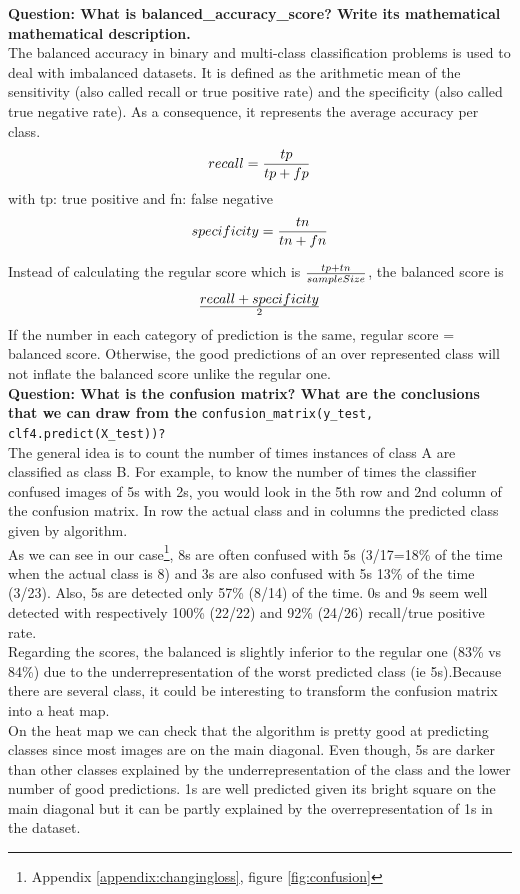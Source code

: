 \textbf{Question: What is balanced\_accuracy\_score? Write its mathematical mathematical description.} \\

The balanced accuracy in binary and multi-class classification problems is used to deal with imbalanced datasets. 
It is defined as the arithmetic mean of the sensitivity (also called recall or true positive rate) and the specificity (also called true negative rate). As a consequence, it represents the average accuracy per class.
\begin{equation*} recall = {tp\over tp + fp}\end{equation*} 
with tp: true positive and fn: false negative
\begin{equation*} specificity = {tn\over tn + fn}\end{equation*} 

Instead of calculating the regular score which is $tp+tn \over sampleSize$, the balanced score is 
\begin{equation*}
	recall+specificity \over 2
\end{equation*}
If the number in each category of prediction is the same, regular score = balanced score. Otherwise, the good predictions of an over represented class will not inflate the balanced score unlike the regular one.\\


\textbf{Question: What is the confusion matrix? What are the conclusions that we can draw from the} \verb|confusion_matrix(y_test, clf4.predict(X_test))?| \\

The general idea is to count the number of times instances of class A are classified as class B. For example, to know the number of times the classifier confused images of 5s with 2s, you would look in the 5th row and 2nd column of the confusion matrix. In row the actual class and in columns the predicted class given by algorithm. \\

As we can see in our case\footnote{Appendix \ref{appendix:changingloss}, figure \ref{fig:confusion}}, 8s are often confused with 5s (3/17=18\% of the time when the actual class is 8) and 3s are also confused with 5s 13\% of the time (3/23). Also, 5s are detected only 57\% (8/14) of the time. 0s and 9s seem well detected with respectively 100\% (22/22) and 92\% (24/26) recall/true positive rate.\\

Regarding the scores, the balanced is slightly inferior to the regular one (83\% vs 84\%) due to the underrepresentation of the worst predicted class (ie 5s).Because there are several class, it could be interesting to transform the confusion matrix into a heat map. \\

On the heat map we can check that the algorithm is pretty good at predicting classes since most images are on the main diagonal. Even though, 5s are darker than other classes explained by the underrepresentation of the class and the lower number of good predictions. 1s are well predicted given its bright square on the main diagonal but it can be partly explained by the overrepresentation of 1s in the dataset. 


